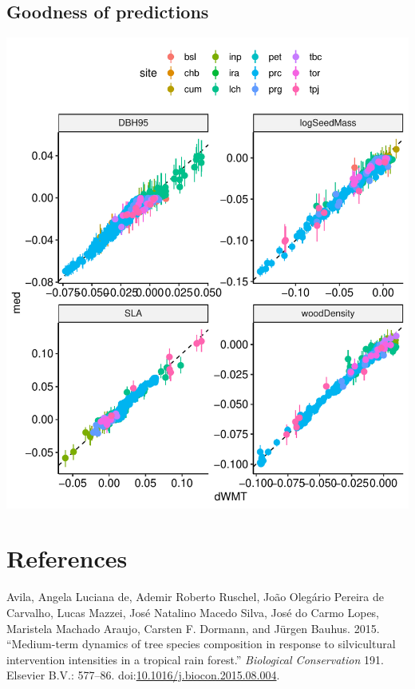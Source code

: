 \documentclass[]{elsarticle} %
\makeatletter
\def\maxwidth{\ifdim\Gin@nat@width>\linewidth\linewidth
\else\Gin@nat@width\fi}
\let\Oldincludegraphics\includegraphics
\renewcommand{\includegraphics}[1]{\Oldincludegraphics[width=\maxwidth]{#1}}
\makeatother
\begin{document}
\subsection{Goodness of predictions}\label{goodness-of-predictions}

\includegraphics{rticle_tmfo_functional_files/figure-latex/gof-1.pdf}

\section*{References}\label{references}

\hypertarget{refs}{}
\hypertarget{ref-DeAvila2015}{}
Avila, Angela Luciana de, Ademir Roberto Ruschel, João Olegário Pereira
de Carvalho, Lucas Mazzei, José Natalino Macedo Silva, José do Carmo
Lopes, Maristela Machado Araujo, Carsten F. Dormann, and Jürgen Bauhus.
2015. ``Medium-term dynamics of tree species composition in response to
silvicultural intervention intensities in a tropical rain forest.''
\emph{Biological Conservation} 191. Elsevier B.V.: 577--86.
doi:\href{https://doi.org/10.1016/j.biocon.2015.08.004}{10.1016/j.biocon.2015.08.004}.
\end{document}
